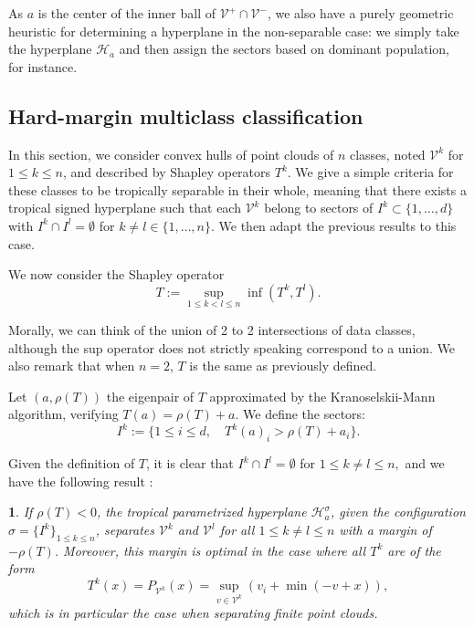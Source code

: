 \documentclass[oneside,english,a4paper]{amsart}
\numberwithin{equation}{section}
\numberwithin{figure}{section}
\theoremstyle{plain}
\theoremstyle{definition}
\theoremstyle{plain}
\newtheorem{prop}[thm]{\protect\propositionname}
\theoremstyle{remark}
\theoremstyle{plain}
\theoremstyle{definition}
\theoremstyle{definition}
\providecommand{\propositionname}{Proposition}
\begin{document}
As $a$ is the center of the inner ball of $\mathcal{V}^{+}\cap\mathcal{V}^{-}$,
we also have a purely geometric heuristic for determining a
hyperplane in the non-separable case: we simply take the hyperplane
$\mathcal{H}_{a}$ and then assign the sectors based on dominant
population, for instance.


\subsection{Hard-margin multiclass classification}

In this section, we consider convex hulls of point clouds of $n$
classes, noted $\mathcal{V}^{k}$ for $1\le k \le n$, and described by Shapley operators
$T^{k}$. We give a simple criteria for these classes to be tropically separable in their whole, meaning that there exists a tropical signed
hyperplane such that each $\mathcal{V}^{k}$ belong to sectors of $I^{k}\subset\{1,\ldots, d\}$
with $I^{k}\cap I^{l}=\emptyset$ for $k\ne l\in\{1, \ldots, n\}.$ We then adapt
the previous results to this case.

We now consider the Shapley operator
\[
T:=\sup_{1\le k<l\le n}\inf(T^{k}, T^{l}).
\]

Morally, we can think of the union of 2 to 2 intersections of data classes, although the sup operator does not strictly speaking correspond to a union. We also remark that when $n=2$, $T$ is the same as previously
defined.

Let $(a,\rho(T))$ the eigenpair of $T$ approximated by the Kranoselskii-Mann
algorithm, verifying $T(a)=\rho(T)+a$. We define the sectors:
\[
I^{k}:=\{1\le i\le d,\quad T^{k}(a)_{i}>\rho(T)+a_{i}\}.
\]

Given the definition of $T$, it is clear that $I^{k}\cap I^{l}=\emptyset$
for $1\le k\ne l\le n,$ and we have the following result :
\begin{prop}
If $\rho(T)<0$, the tropical parametrized hyperplane $\mathcal{H}_{a}^{\sigma}$,
given the configuration $\sigma=\{I^{k}\}_{1\le k\le n}$, separates $\mathcal{V}^{k}$
and $\mathcal{V}^{l}$ for all $1 \le k\ne l \le n$ with a margin of $-\rho(T)$.
Moreover, this margin is optimal in the case where all $T^{k}$ are
of the form
\[
T^{k}(x)=P_{\mathcal{V}^{k}}(x)=\sup_{v\in \mathcal{V}^{k}}\left(v_{i}+\min(-v+x)\right),
\]
 which is in particular the case when separating finite point clouds. 
\end{prop}
\end{document}
